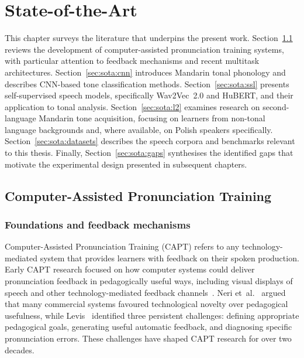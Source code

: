 
\chapter{State-of-the-Art}\label{chapter:2_StateOfTheArt}

This chapter surveys the literature that underpins the present work. Section~\ref{sec:sota:capt} reviews the development of computer-assisted pronunciation training systems, with particular attention to feedback mechanisms and recent multitask architectures. Section~\ref{sec:sota:cnn} introduces Mandarin tonal phonology and describes CNN-based tone classification methods. Section~\ref{sec:sota:ssl} presents self-supervised speech models, specifically Wav2Vec~2.0 and HuBERT, and their application to tonal analysis. Section~\ref{sec:sota:l2} examines research on second-language Mandarin tone acquisition, focusing on learners from non-tonal language backgrounds and, where available, on Polish speakers specifically. Section~\ref{sec:sota:datasets} describes the speech corpora and benchmarks relevant to this thesis. Finally, Section~\ref{sec:sota:gaps} synthesises the identified gaps that motivate the experimental design presented in subsequent chapters.

\section{Computer-Assisted Pronunciation Training}
\label{sec:sota:capt}

\subsection{Foundations and feedback mechanisms}

Computer-Assisted Pronunciation Training (CAPT) refers to any technology-mediated system that provides learners with feedback on their spoken production. Early CAPT research focused on how computer systems could deliver pronunciation feedback in pedagogically useful ways, including visual displays of speech and other technology-mediated feedback channels~\cite{neri2002,levis2007}. Neri et~al.~\cite{neri2002} argued that many commercial systems favoured technological novelty over pedagogical usefulness, while Levis~\cite{levis2007} identified three persistent challenges: defining appropriate pedagogical goals, generating useful automatic feedback, and diagnosing specific pronunciation errors. These challenges have shaped CAPT research for over two decades.

